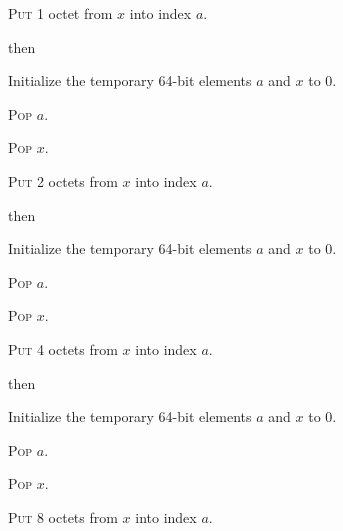 \documentclass[a4paper,12pt]{article}
\newcommand{\num}[1]{\texttt{#1}}
\newcommand{\hex}[1]{\num{#1}_{\textup{\tiny 16}}}
\newcommand{\proc}[1]{\textsc{#1}}
\newcommand{\op}[1]{$#1$}
\theoremstyle{definition}
\newcommand{\STORES}    [1]{\op{\hex{15}}}
\newcommand{\STOREI}    [1]{\op{\hex{16}}}
\newcommand{\STOREL}    [1]{\op{\hex{17}}}
\begin{document}
\begin{stepnumbers}[start=3]
\begin{description}
\begin{stepnumbers}
    \item \proc{Put} 1 octet from $x$ into index $a$.
    \end{stepnumbers}
  \item[\STORES{}] then
    \begin{stepnumbers}
    \item Initialize the temporary 64-bit elements $a$ and $x$ to 0.
    \item \proc{Pop} $a$.
    \item \proc{Pop} $x$.
    \item \proc{Put} 2 octets from $x$ into index $a$.
    \end{stepnumbers}
  \item[\STOREI{}] then
    \begin{stepnumbers}
    \item Initialize the temporary 64-bit elements $a$ and $x$ to 0.
    \item \proc{Pop} $a$.
    \item \proc{Pop} $x$.
    \item \proc{Put} 4 octets from $x$ into index $a$.
    \end{stepnumbers}
  \item[\STOREL{}] then
    \begin{stepnumbers}
    \item Initialize the temporary 64-bit elements $a$ and $x$ to 0.
    \item \proc{Pop} $a$.
    \item \proc{Pop} $x$.
    \item \proc{Put} 8 octets from $x$ into index $a$.
    \end{stepnumbers}
  \end{description}
\end{stepnumbers}
\end{document}

